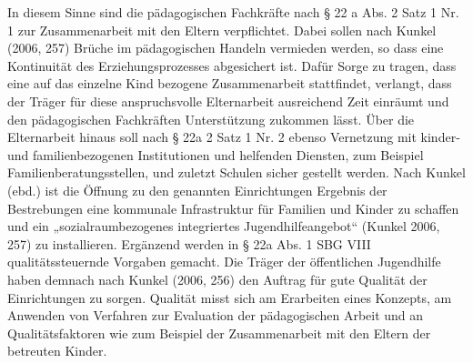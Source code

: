 In diesem Sinne sind die pädagogischen Fachkräfte nach § 22 a Abs. 2 Satz 1 Nr. 1 zur Zusammenarbeit mit den Eltern verpflichtet. Dabei sollen nach Kunkel (2006, 257) Brüche im pädagogischen Handeln vermieden werden, so dass eine Kontinuität des Erziehungsprozesses abgesichert ist. Dafür Sorge zu tragen, dass eine auf das einzelne Kind bezogene Zusammenarbeit stattfindet, verlangt, dass der Träger für diese anspruchsvolle Elternarbeit ausreichend Zeit einräumt und den pädagogischen Fachkräften Unterstützung zukommen lässt. Über die Elternarbeit hinaus soll nach § 22a 2 Satz 1 Nr. 2 ebenso Vernetzung mit kinder- und familienbezogenen Institutionen und helfenden Diensten, zum Beispiel Familienberatungsstellen, und zuletzt Schulen sicher gestellt werden. Nach Kunkel (ebd.) ist die Öffnung zu den genannten Einrichtungen Ergebnis der Bestrebungen eine kommunale Infrastruktur für Familien und Kinder zu schaffen und ein „sozialraumbezogenes integriertes Jugendhilfeangebot“ (Kunkel 2006, 257) zu installieren. Ergänzend werden in § 22a Abs. 1 SBG VIII qualitätssteuernde Vorgaben gemacht. Die Träger der öffentlichen Jugendhilfe haben demnach nach Kunkel (2006, 256) den Auftrag für gute Qualität der Einrichtungen zu sorgen. Qualität misst sich am Erarbeiten eines Konzepts, am Anwenden von Verfahren zur Evaluation der pädagogischen Arbeit und an Qualitätsfaktoren wie zum Beispiel der Zusammenarbeit mit den Eltern der betreuten Kinder.

